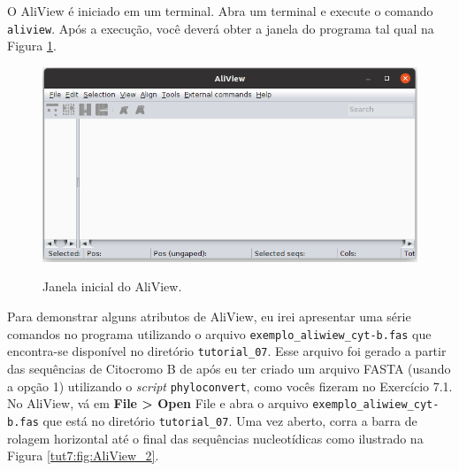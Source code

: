 \begin{refsection}
O AliView é iniciado em um terminal. Abra um terminal e execute o comando \texttt{aliview}. Após a execução, você deverá obter a janela do programa tal qual na Figura \ref{tut7:fig:AliView}.


  \begin{figure}[H]
       \centering
      {\includegraphics[scale=0.5]{figures/tut7/aliview_01.png}}
	{\caption[AliView: janela inicial]{Janela inicial do AliView.}\label{tut7:fig:AliView}}
  \end{figure}


Para demonstrar alguns atributos de AliView, eu irei apresentar uma série comandos no programa utilizando o arquivo \texttt{exemplo\_aliwiew\_cyt-b.fas} que encontra-se disponível no diretório \texttt{tutorial\_07}. Esse arquivo foi gerado a partir das sequências de Citocromo B de \textcite{dias_et_al_2013} após eu ter criado um arquivo FASTA (usando a opção 1) utilizando o \textit{script} \texttt{phyloconvert}, como vocês fizeram no Exercício 7.1.\\

No AliView, vá em \textbf{File > Open} File e abra o arquivo \texttt{exemplo\_aliwiew\_cyt-b.fas} que está no diretório \texttt{tutorial\_07}. Uma vez aberto, corra a barra de rolagem horizontal até o final das sequências nucleotídicas como ilustrado na Figura \ref{tut7:fig:AliView_2}.


\end{refsection}
